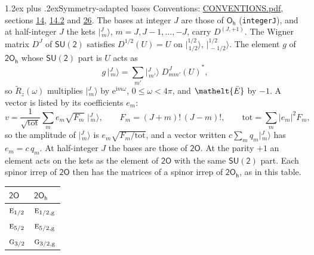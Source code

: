 \documentclass[10pt,a4paper]{article}
\makeatletter
\renewcommand\section{\@startsection{section}{1}{\z@}{-3ex plus -1ex minus -.2ex}%
  {1.2ex plus .2ex}{\normalfont\large\sffamily\bfseries\color{parttitle}}}
\numberwithin{equation}{section}
\newcommand{\eltfont}[1]{{\let\sigma\eltsigma\mathelt{#1}}}
\newcommand{\grp}[1]{\mathsf{#1}}
\newcommand{\irr}[1]{\text{\normalfont\scshape #1}}
\newcommand{\elt}[1]{\eltfont{#1}}
\newcommand{\ptag}[1]{\mathrm{#1}}
\newcommand{\iunit}{\mathrm{i}}
\newcommand{\expe}{\mathrm{e}}
\newcommand{\irrJp}[2]{D^{(#1,#2)}}
\newcommand{\wignerD}[1]{D^{#1}}
\newcommand{\conj}[1]{{#1}^{*}}
\newcommand{\jm}[2]{\bigl\lvert{}^{#1}_{\,#2}\bigr\rangle}
\newcommand{\barred}[1]{\bar{#1}}
\newcommand{\lift}[1]{\tilde{#1}}
\makeatother
\begin{document}
\section{Symmetry-adapted bases}\label{s:bases}
Conventions: \href{../../CONVENTIONS.pdf}{CONVENTIONS.pdf}, sections \href{../../../rotation/CONVENTIONS.pdf\#conv.14}{14}, \href{../../../rotation/CONVENTIONS.pdf\#conv.14.2}{14.2} and \href{../../CONVENTIONS.pdf\#conv.26}{26}.
\leavevmode\label{n:index.m}\label{n:vector.ket}The bases at integer $J$ are those of \href{../../../rotation/data/pdf/Oh.pdf}{$\grp{O_{h}}$} (\texttt{integerJ}), and at half-integer $J$ the kets $\jm{J}{m}$, $m = J, J-1, \dots, -J$, carry $\irrJp{J}{+1}$. \label{n:matrix.wigner}The Wigner matrix $\wignerD{J}$ of $\grp{SU(2)}$ satisfies $\wignerD{1/2}(U) = U$ on $\jm{1/2}{1/2}$, $\jm{1/2}{-1/2}$. The element $g$ of $\grp{2O_{h}}$ whose $\grp{SU(2)}$ part is $U$ acts as
\begin{equation}\label{e:action}g\,\jm{J}{m} = \sum_{m'} \jm{J}{m'}\; \conj{\wignerD{J}_{m m'}(U)},\end{equation}
so $\lift{R}_{z}(\omega)$ multiplies $\jm{J}{m}$ by $\expe^{\iunit m\omega}$, $0 \le \omega < 4\pi$, and $\elt{\barred{E}}$ by $-1$. \label{n:index.ketcoefficient}\label{n:vector.basis.symmetry}\label{n:index.ketweight}\label{n:index.total}A vector is listed by its coefficients $e_m$:
\begin{equation}\label{e:ket}v = \frac{1}{\sqrt{\mathrm{tot}}}\sum_m e_m\sqrt{F_m}\;\jm{J}{m},\qquad F_m = (J+m)!\,(J-m)!,\qquad \mathrm{tot} = \sum_m |e_m|^2F_m,\end{equation}
\leavevmode\label{n:index.factor.c}so the amplitude of $\jm{J}{m}$ is $e_m\sqrt{F_m/\mathrm{tot}}$, and a vector written $c\sum_m q_m\jm{J}{m}$ has $e_m = c\,q_m$.
At half-integer $J$ the bases are those of $\grp{2O}$. At the parity $+1$ an element acts on the kets as the element of $\grp{2O}$ with the same $\grp{SU(2)}$ part. Each spinor irrep of $\grp{2O}$ then has the matrices of a spinor irrep of $\grp{2O_{h}}$, as in this table.
\begin{center}\begin{tabular}{@{}ll@{}}\toprule
$\grp{2O}$ & $\grp{2O_{h}}$\\\midrule
$\irr{e}_{1/2}$ & $\irr{e}_{1/2,\ptag{g}}$\\
$\irr{e}_{5/2}$ & $\irr{e}_{5/2,\ptag{g}}$\\
$\irr{g}_{3/2}$ & $\irr{g}_{3/2,\ptag{g}}$\\
\bottomrule\end{tabular}\end{center}
\end{document}
